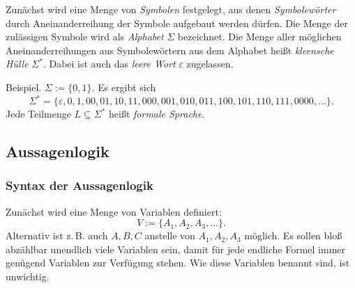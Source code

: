 \documentclass[a4paper,11pt,fleqn,twoside]{scrartcl}
\numberwithin{equation}{section}
\theoremstyle{rmbox}
\newcommand{\emdef}[1]{\emph{#1}}
\begin{document}
Zunächst wird eine Menge von \emdef{Symbolen} festgelegt, aus denen
\emdef{Symbolewörter} durch Aneinanderreihung der Symbole aufgebaut
werden dürfen. Die Menge der zulässigen Symbole wird als
\emdef{Alphabet} $\Sigma$ bezeichnet. Die Menge aller möglichen
Aneinanderreihungen aus Symbolewörtern aus dem Alphabet heißt
\emdef{kleensche Hülle} $\Sigma^*$. Dabei ist auch das
\emdef{leere Wort} $\varepsilon$ zugelassen.

Beispiel. $\Sigma:=\{0,1\}$. Es ergibt sich
\begin{equation}
\Sigma^* = \{\varepsilon,0,1,00,01,10,11,000,001,010,011,100,101,110,111,0000,\ldots\}.
\end{equation}
Jede Teilmenge $L\subseteq\Sigma^*$ heißt \emdef{formale Sprache}.

\subsection{Aussagenlogik}
\subsubsection{Syntax der Aussagenlogik}
Zunächst wird eine Menge von Variablen definiert:
\begin{equation}
V:=\{A_1,A_2,A_3,\ldots\}.
\end{equation}
Alternativ ist z.\,B. auch $A,B,C$ anstelle von $A_1,A_2,A_3$ möglich.
Es sollen bloß abzählbar unendlich viele Variablen sein, damit
für jede endliche Formel immer genügend Variablen zur Verfügung
stehen. Wie diese Variablen benannt sind, ist unwichtig.
\end{document}

